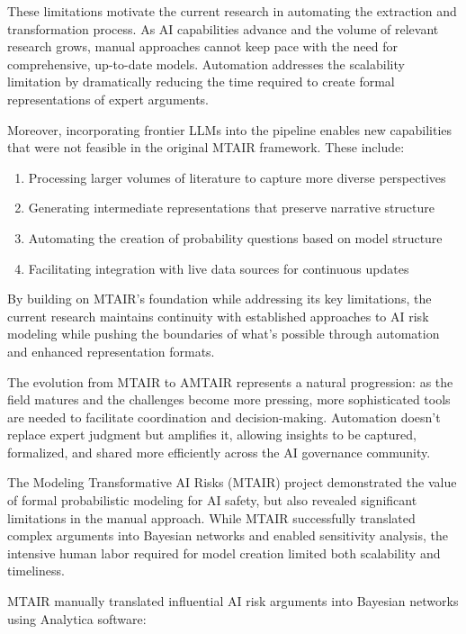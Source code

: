 \documentclass[
  11pt,
  letterpaper,
]{book}
\providecommand{\tightlist}{%
  \setlength{\itemsep}{0pt}\setlength{\parskip}{0pt}}
\begin{document}
These limitations motivate the current research in automating the
extraction and transformation process. As AI capabilities advance and
the volume of relevant research grows, manual approaches cannot keep
pace with the need for comprehensive, up-to-date models. Automation
addresses the scalability limitation by dramatically reducing the time
required to create formal representations of expert arguments.

Moreover, incorporating frontier LLMs into the pipeline enables new
capabilities that were not feasible in the original MTAIR framework.
These include:

\begin{enumerate}
\def\labelenumi{\arabic{enumi}.}
\tightlist
\item
  Processing larger volumes of literature to capture more diverse
  perspectives
\item
  Generating intermediate representations that preserve narrative
  structure
\item
  Automating the creation of probability questions based on model
  structure
\item
  Facilitating integration with live data sources for continuous updates
\end{enumerate}

By building on MTAIR's foundation while addressing its key limitations,
the current research maintains continuity with established approaches to
AI risk modeling while pushing the boundaries of what's possible through
automation and enhanced representation formats.

The evolution from MTAIR to AMTAIR represents a natural progression: as
the field matures and the challenges become more pressing, more
sophisticated tools are needed to facilitate coordination and
decision-making. Automation doesn't replace expert judgment but
amplifies it, allowing insights to be captured, formalized, and shared
more efficiently across the AI governance community.

The Modeling Transformative AI Risks (MTAIR) project demonstrated the
value of formal probabilistic modeling for AI safety, but also revealed
significant limitations in the manual approach. While MTAIR successfully
translated complex arguments into Bayesian networks and enabled
sensitivity analysis, the intensive human labor required for model
creation limited both scalability and timeliness.

MTAIR manually translated influential AI risk arguments into Bayesian
networks using Analytica software:
\end{document}
